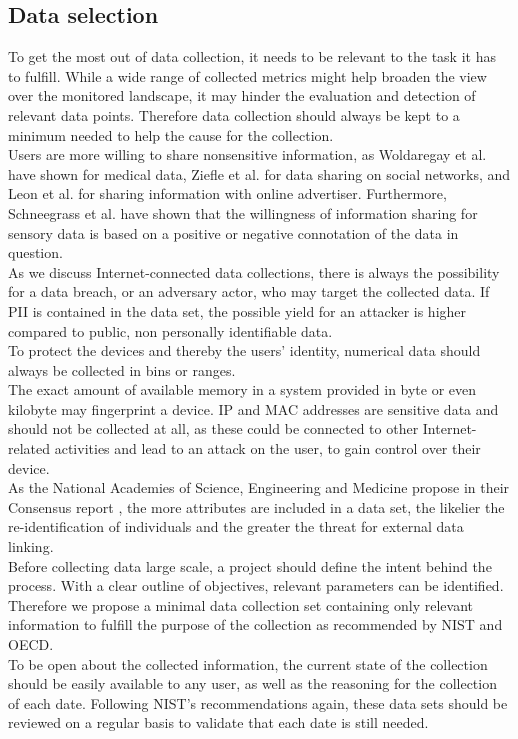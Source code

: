     \subsection{Data selection}
        \label{subsec:software_design:selection}
        To get the most out of data collection, it needs to be relevant to the task it has to fulfill.
        While a wide range of collected metrics might help  broaden the view over the monitored landscape, it may hinder the evaluation and detection of relevant data points. Therefore data collection should always be kept to a minimum needed to help the cause for the collection.\\
        Users are more willing to share nonsensitive information, as Woldaregay et al.   \cite{woldaregay_user_2020} have shown for medical data, Ziefle et al.  \cite{ziefle_users_2016} for data sharing on social networks, and Leon et al.  \cite{leon_what_2013} for sharing information with online advertiser. Furthermore, Schneegrass et al.  \cite{10.1145/3290605.3300753} have shown that the willingness of information sharing for sensory data is based on a positive or negative connotation of the data in question.\\
        
        As we discuss Internet-connected data collections, there is always the possibility for a data breach, or an adversary actor, who may target the collected data. If PII is contained in the data set, the possible yield for an attacker is higher compared to public, non personally identifiable data.\\
        To protect the devices and thereby the users' identity, numerical data should always be collected in bins or ranges.\\
        The exact amount of available memory in a system provided in byte or even kilobyte may fingerprint a device. IP and MAC addresses are sensitive data and should not be collected at all, as these could be connected to other Internet-related activities and lead to an attack on the user, to gain control over their device. \\
        As the National Academies of Science, Engineering and Medicine propose in their Consensus report \cite{groves_federal_2017}, the more attributes are included in a data set, the likelier the re-identification of individuals and the greater the threat for external data linking.\\
        
        Before collecting data large scale, a project should define the intent behind the process. With a clear outline of objectives, relevant parameters can be identified. 
        Therefore we propose a minimal data collection set containing only relevant information to fulfill the purpose of the collection as recommended by NIST and OECD.\\
        To be open about the collected information, the current state of the collection should be easily available to any user, as well as the reasoning for the collection of each date.
        Following NIST's recommendations again, these data sets should be reviewed on a regular basis to validate that each date is still needed.\\
        
